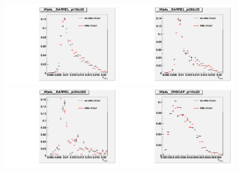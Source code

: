 \begin{figure}[htb]
  \begin{center}
  \includegraphics[width=0.45\textwidth]{../figs/figs_v11/ChannelsMERGED_WGamma/QuickChecks/cTemplatesVsWMt_Wjets_phoSigmaIEtaIEta_BARREL_pt15to20.pdf} \includegraphics[width=0.45\textwidth]{../figs/figs_v11/ChannelsMERGED_WGamma/QuickChecks/cTemplatesVsWMt_Wjets_phoSigmaIEtaIEta_BARREL_pt20to35.pdf} \\
  \includegraphics[width=0.45\textwidth]{../figs/figs_v11/ChannelsMERGED_WGamma/QuickChecks/cTemplatesVsWMt_Wjets_phoSigmaIEtaIEta_BARREL_pt35to500.pdf}  \includegraphics[width=0.45\textwidth]{../figs/figs_v11/ChannelsMERGED_WGamma/QuickChecks/cTemplatesVsWMt_Wjets_phoSigmaIEtaIEta_ENDCAP_pt15to20.pdf} \\

\end{center}
\end{figure}
